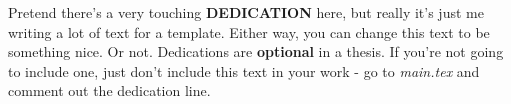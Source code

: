 \begin{dedicatoria}
   \vspace*{\fill}
   \text
    Pretend there's a very touching \textbf{DEDICATION} here, but really it's just me writing a lot of text for a template. Either way, you can change this text to be something nice. Or not. Dedications are \textbf{optional} in a thesis. If you're not going to include one, just don't include this text in your work - go to \textit{main.tex} and comment out the dedication line.

\end{dedicatoria}
